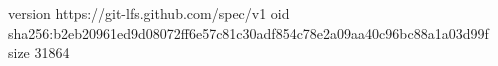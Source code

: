 version https://git-lfs.github.com/spec/v1
oid sha256:b2eb20961ed9d08072ff6e57c81c30adf854c78e2a09aa40c96bc88a1a03d99f
size 31864
